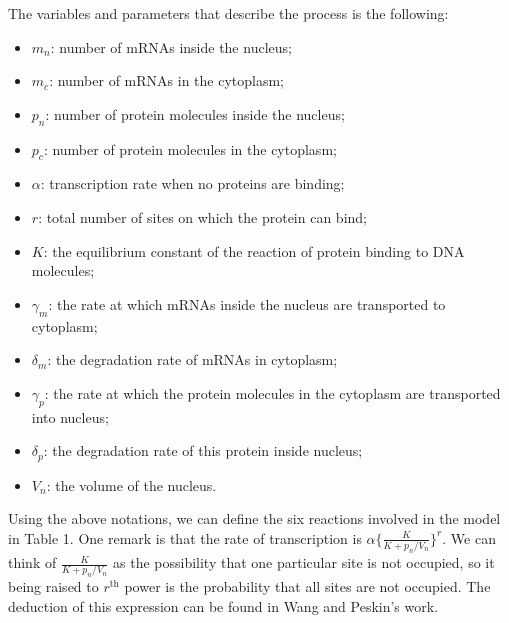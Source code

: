 \documentclass[12pt]{article}
\renewcommand{\(}{\left (}
\renewcommand{\)}{\right )}
\begin{document}
The variables and parameters that describe the process is the following:
\begin{itemize}
  \item $m_n$: number of mRNAs inside the nucleus;
  \item $m_c$: number of mRNAs in the cytoplasm;
  \item $p_n$: number of protein molecules inside the nucleus;
  \item $p_c$: number of protein molecules in the cytoplasm;
  \item $\alpha$: transcription rate when no proteins are binding;
  \item $r$: total number of sites on which the protein can bind;
  \item $K$: the equilibrium constant of the reaction of protein binding to DNA molecules;
  \item $\gamma_m$: the rate at which mRNAs inside the nucleus are transported to cytoplasm;
  \item $\delta_m$: the degradation rate of mRNAs in cytoplasm;
  \item $\gamma_p$: the rate at which the protein molecules in the cytoplasm are transported into nucleus;
  \item $\delta_p$: the degradation rate of this protein inside nucleus;
	\item $V_n$: the volume of the nucleus.
\end{itemize}

Using the above notations, we can define the six reactions involved in the model in Table 1. One remark is that the rate of transcription is $\alpha \{\frac{K}{K + p_n / V_n}\}^r.$ We can think of $\frac{K}{K + p_n / V_n}$ as the possibility that one particular site is not occupied, so it being raised to $r^\text{th}$ power is the probability that all sites are not occupied. The deduction of this expression can be found in Wang and Peskin's work.
\end{document}

